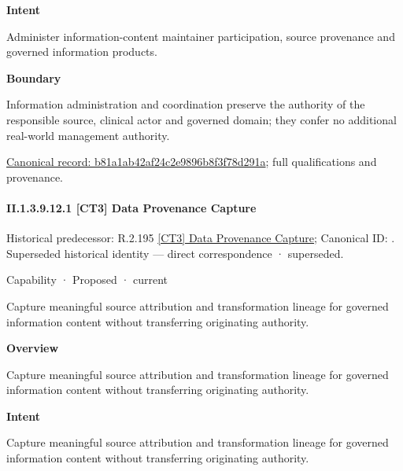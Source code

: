 \textbf{Intent}



Administer information-content maintainer participation, source provenance and governed information products.



\textbf{Boundary}



Information administration and coordination preserve the authority of the responsible source, clinical actor and governed domain; they confer no additional real-world management authority.


{\footnotesize \href{../../../../../../../continuum/strategy/capability/b81a1ab42af24c2e9896b8f3f78d291a.md}{Canonical record: b81a1ab42af24c2e9896b8f3f78d291a}; full qualifications and provenance.}\par
\paragraph*{II.1.3.9.12.1 [CT3] Data Provenance Capture}
\label{navigation:II.1.3.9.12.1}

{\small Historical predecessor: R.2.195 \hyperref[element:61258c7fe41f4541871a67ec9d7185cf]{[CT3] Data Provenance Capture}; Canonical ID: \texttt{}. Superseded historical identity — direct correspondence · superseded.}\par
\label{element:44a7937520a54945b06b5fd4a2bbd870}
{\small Capability · Proposed · current}\par

Capture meaningful source attribution and transformation lineage for governed information content without transferring originating authority.



\textbf{Overview}



Capture meaningful source attribution and transformation lineage for governed information content without transferring originating authority.



\textbf{Intent}



Capture meaningful source attribution and transformation lineage for governed information content without transferring originating authority.




